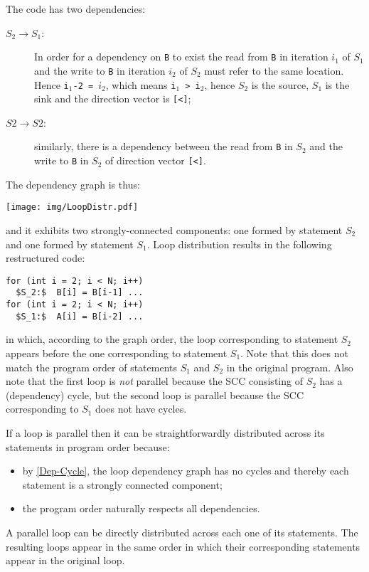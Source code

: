 The code has two dependencies:
\begin{description}
\item[$S_2\to S_1$:]  In order for a dependency on \texttt{B} to exist
  the read from \texttt{B} in iteration $i_1$ of $S_1$ and
  the write to \texttt{B} in iteration $i_2$ of $S_2$ must refer
  to the same location. Hence \texttt{i$_1$-2 = $i_2$}, which means
  \texttt{i$_1$ > i$_2$}, hence $S_2$ is the source, $S_1$ is the
  sink and the direction vector is \texttt{[<]};
\item[$S2\to S2$:] similarly, there is a dependency between the
  read from \texttt{B} in $S_2$ and the write to \texttt{B} in $S_2$
  of direction vector \texttt{[<]}.
\end{description}

The dependency graph is thus:
\begin{center}
\texttt{[image: img/LoopDistr.pdf]}
\end{center}

\noindent and it exhibits two strongly-connected components:
one formed by statement $S_2$ and one formed by statement $S_1$.
Loop distribution results in the following restructured code:
\begin{lstlisting}[mathescape=true]
for (int i = 2; i < N; i++)
  $S_2:$  B[i] = B[i-1] ...
for (int i = 2; i < N; i++)
  $S_1:$  A[i] = B[i-2] ...
\end{lstlisting}
in which, according to the graph order, the loop corresponding to
statement $S_2$ appears before the one corresponding to statement
$S_1$. Note that this does not match the program order of statements
$S_1$ and $S_2$ in the original program. Also note that the first loop
is \emph{not} parallel because the SCC consisting of $S_2$ has a
(dependency) cycle, but the second loop is parallel because the SCC
corresponding to $S_1$ does not have cycles.

If a loop is parallel then it can be straightforwardly distributed
across its statements in program order because:
\begin{itemize}
\item by \cref{Dep-Cycle}, the loop dependency graph has no cycles and
  thereby each statement is a strongly connected component;
\item the program order naturally respects all dependencies.
\end{itemize}

\begin{corollary}\label{Par-Loop-Distr}
  A parallel loop can be directly distributed across each one of its
  statements. The resulting loops appear in the same order in which
  their corresponding statements appear in the original loop.
\end{corollary}

